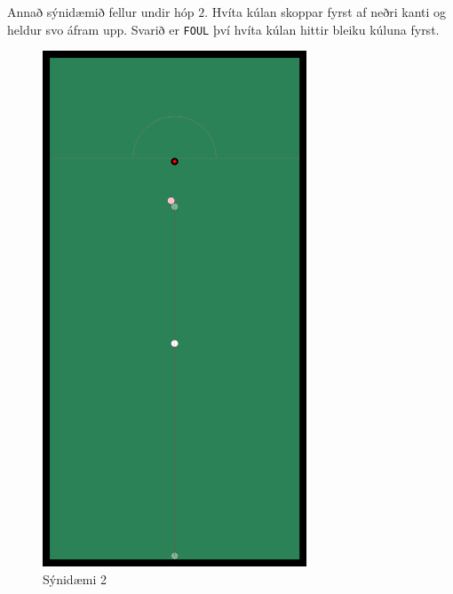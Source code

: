 Annað sýnidæmið fellur undir hóp $2$. Hvíta kúlan skoppar fyrst af neðri kanti og heldur svo áfram upp. Svarið er \texttt{FOUL} því hvíta kúlan hittir bleiku kúluna fyrst.
\begin{figure}[ht!]
  \centering
    \includegraphics[width=0.7\textwidth]{sample2}
  \caption{Sýnidæmi 2}
\end{figure}

